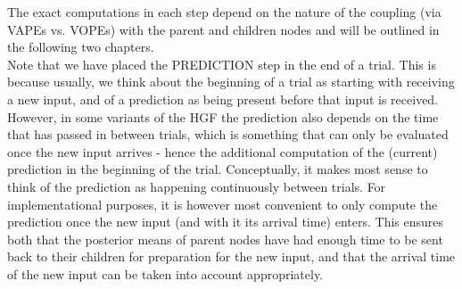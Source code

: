 \vspace{1cm}
\noindent
The exact computations in each step depend on the nature of the coupling (via \textsf{VAPE}s vs. \textsf{VOPE}s) with the parent and children nodes and will be outlined in the following two chapters.\\

Note that we have placed the \textsf{PREDICTION step} in the end of a trial. This is because usually, we think about the beginning of a trial as starting with receiving a new input, and of a prediction as being present before that input is received. However, in some variants of the HGF the prediction also depends on the time that has passed in between trials, which is something that can only be evaluated once the new input arrives - hence the additional computation of the (current) prediction in the beginning of the trial. Conceptually, it makes most sense to think of the prediction as happening continuously between trials. For implementational purposes, it is however most convenient to only compute the prediction once the new input (and with it its arrival time) enters. This ensures both that the posterior means of parent nodes have had enough time to be sent back to their children for preparation for the new input, and that the arrival time of the new input can be taken into account appropriately.


